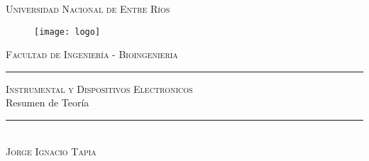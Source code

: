 \begin{titlepage}
	\begin{center}
		\centering \Huge \textsc{Universidad Nacional de Entre Ríos} \\
	\end{center}
\vspace{1cm}
	
	\begin{figure}[h]
		\centering
		\texttt{[image: logo]}	
	\end{figure}
\vspace{1.5cm}
	\centering \LARGE \textsc{Facultad de Ingeniería - Bioingenieria}
\vspace{1cm}
	
	\textcolor{blue-violet}{\rule{\linewidth}{0.75mm}}
	\vspace{1mm}
	\begin{spacing}{1.5}
		\centering \LARGE \textsc{Instrumental y Dispositivos Electronicos} \\
		\centering \LARGE {Resumen de Teoría}
	\end{spacing}
	\vspace{5mm}
	\textcolor{blue-violet}{\rule{\linewidth}{0.75mm}}\\
	\vspace{1cm}
	\vfill
	\centering \LARGE  \textsc{Jorge Ignacio Tapia}
	\vfill
\end{titlepage}